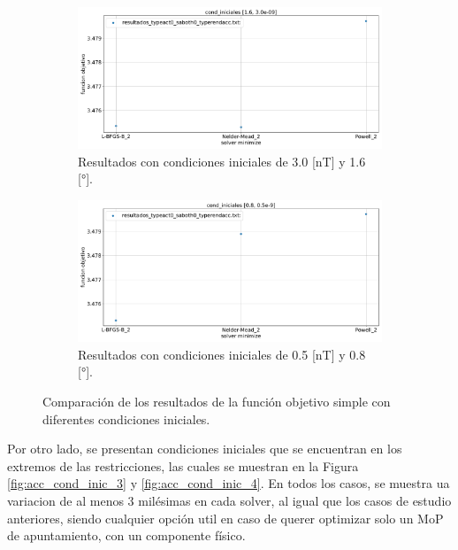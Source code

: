 \begin{figure}[h!]
	\centering
	\begin{subfigure}[b]{0.8\textwidth}
		\centering
		\includegraphics[width=\textwidth]{cond_iniciales_1.6_3.0e-9.pdf}
		\caption{Resultados con condiciones iniciales de 3.0 [nT] y 1.6 [°].}
		\label{fig:acc_cond_inic_1}
	\end{subfigure}
	\hfill
	\begin{subfigure}[b]{0.8\textwidth}
		\centering
		\includegraphics[width=\textwidth]{cond_iniciales_0.8_0.5e-9.pdf}
		\caption{Resultados con condiciones iniciales de 0.5 [nT] y 0.8 [°].}
		\label{fig:acc_cond_inic_2}
	\end{subfigure}
	\caption{Comparación de los resultados de la función objetivo simple con diferentes condiciones iniciales.}
	\label{fig:acc_cond_inic_comparacion}
\end{figure}

Por otro lado, se presentan condiciones iniciales que se encuentran en los extremos de las restricciones, las cuales se muestran en la Figura \ref{fig:acc_cond_inic_3} y \ref{fig:acc_cond_inic_4}. En todos los casos, se muestra ua variacion de al menos 3 milésimas en cada solver, al igual que los casos de estudio anteriores, siendo cualquier opción util en caso de querer optimizar solo un MoP de apuntamiento, con un componente físico.

